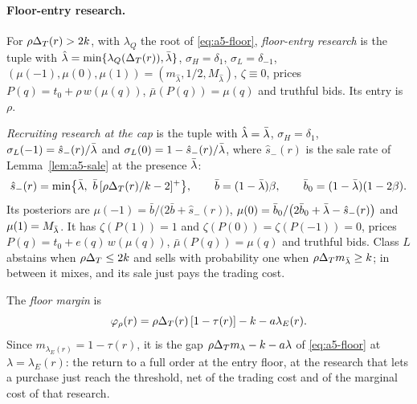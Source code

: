 \paragraph{Floor-entry research.}
For \(\rho\Delta_T(r)>2k\), with \(\lambda_Q\) the root of \eqref{eq:a5-floor}, \emph{floor-entry research} is the tuple
with \(\hat\lambda=\min\{\lambda_Q(\Delta_T(r)),\bar\lambda\}\),
\(\sigma_H=\delta_1\), \(\sigma_L=\delta_{-1}\), \((\mu(-1),\mu(0),\mu(1))=(m_{\hat\lambda},1/2,M_{\hat\lambda})\),
\(\zeta\equiv0\), prices \(P(q)=t_0+\rho\,w(\mu(q))\), \(\bar\mu(P(q))=\mu(q)\) and truthful bids. Its entry is
\(\rho\).

\emph{Recruiting research at the cap} is the tuple with \(\hat\lambda=\bar\lambda\), \(\sigma_H=\delta_1\),
\(\sigma_L(-1)=\hat s_-(r)/\bar\lambda\) and \(\sigma_L(0)=1-\hat s_-(r)/\bar\lambda\), where \(\hat s_-(r)\) is the sale rate
of Lemma~\ref{lem:a5-sale} at the presence \(\bar\lambda\):
\[
\hat s_-(r)=\min\bigl\{\bar\lambda,\ \bar b\,[\rho\Delta_T(r)/k-2]^+\bigr\},\qquad \bar b=(1-\bar\lambda)\beta,\qquad
\bar b_0=(1-\bar\lambda)(1-2\beta).
\]
Its posteriors are \(\mu(-1)=\bar b/\bigl(2\bar b+\hat s_-(r)\bigr)\),
\(\mu(0)=\bar b_0/\bigl(2\bar b_0+\bar\lambda-\hat s_-(r)\bigr)\) and \(\mu(1)=M_{\bar\lambda}\). It has \(\zeta(P(1))=1\) and
\(\zeta(P(0))=\zeta(P(-1))=0\), prices \(P(q)=t_0+e(q)\,w(\mu(q))\), \(\bar\mu(P(q))=\mu(q)\) and truthful bids.
Class \(L\) abstains when \(\rho\Delta_T\le2k\) and sells with probability one when \(\rho\Delta_T m_{\bar\lambda}\ge k\); in between it
mixes, and its sale just pays the trading cost.

The \emph{floor margin} is
\[
\varphi_\rho(r)=\rho\Delta_T(r)\,[1-\tau(r)]-k-a\lambda_E(r).
\]
Since \(m_{\lambda_E(r)}=1-\tau(r)\), it is the gap \(\rho\Delta_T m_\lambda-k-a\lambda\) of \eqref{eq:a5-floor} at
\(\lambda=\lambda_E(r)\): the return to a full order at the entry floor, at the research that lets a purchase just
reach the threshold, net of the trading cost and of the marginal cost of that research.

